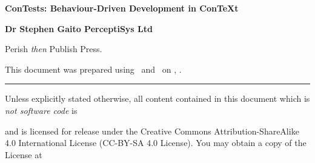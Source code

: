 
\startmakeup

\blank[5cm]
  
\startalignment[center]
\dontleavehmode
\tfd\bf
ConTests: Behaviour-Driven Development in ConTeXt
\stopalignment

\blank[1cm]

\startalignment[center]
\dontleavehmode
\tfc\bf
\stopalignment

\blank[1cm]

\startalignment[center]
\dontleavehmode
\tfb\bf
\stopalignment

\blank[8cm]

\startalignment[flushright]
\dontleavehmode
\tfa\bf
\bTABLE
  \setupTABLE[r][each][frame=off]
  \bTR \bTD Dr Stephen Gaito \eTD \eTR
  \bTR \bTD PerceptiSys Ltd \eTD \eTR
  \bTR \bTD \date \eTD \eTR
\eTABLE
\stopalignment

\blank[5cm]

\startalignment[center]
Perish \emph{then} Publish Press.
\stopalignment

\stopmakeup

\startmakeup

\blank[6cm]



This document was prepared using \ConTeXt\ and \LuaTeX\ on 
\currentdate[month] \currentdate[day], \currentdate[year].


\blank

\hrule
\blank[medium]

Unless explicitly stated otherwise, all content contained in this
document which is \emph{not software code} is

\blank[small]

\startcenteraligned
{}
\stopcenteraligned

\blank[small]

and is licensed for release under the Creative Commons
Attribution-ShareAlike 4.0 International License (CC-BY-SA 4.0 License).
You may obtain a copy of the License at

\blank[small]

\startcenteraligned
{}
\stopcenteraligned

